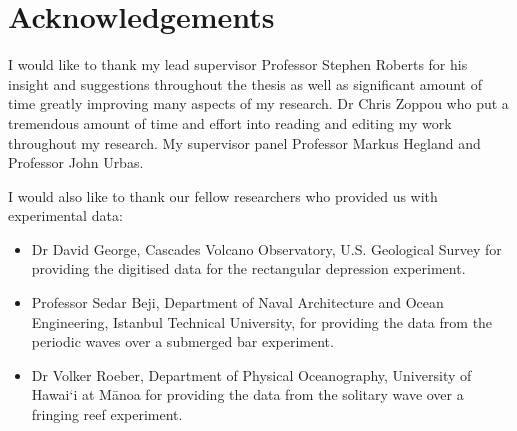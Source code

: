 
\chapter*{Acknowledgements}\label{acknowledgements}




I would like to thank my lead supervisor Professor Stephen Roberts for his insight and suggestions throughout the thesis as well as significant amount of time greatly improving many aspects of my research. Dr Chris Zoppou who put a tremendous amount of time and effort into reading and editing my work throughout my research. My supervisor panel Professor Markus Hegland and Professor John Urbas.


I would also like to thank our fellow researchers who provided us with experimental data:
\begin{itemize}
	\item Dr David George, Cascades Volcano Observatory, U.S. Geological Survey for providing the digitised data for the rectangular depression experiment.
	\item Professor Sedar Beji, Department of Naval Architecture and Ocean Engineering, Istanbul Technical University, for providing the data from the periodic waves over a submerged bar experiment.
	\item Dr Volker Roeber, Department of Physical Oceanography, University of Hawai`i at M\={a}noa for providing the data from the solitary wave over a fringing reef experiment.  
\end{itemize}
